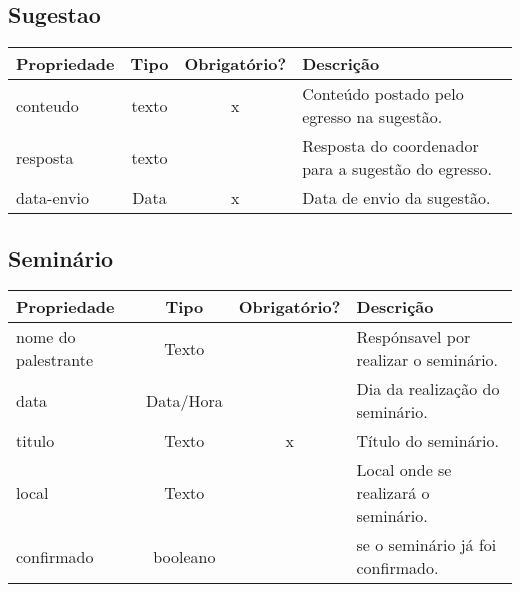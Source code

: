 \subsection{Sugestao} \label{Sugestao}
\begin{table}[h!]
	\footnotesize
	\begin{tabular}{|p{2.6cm}|c|c|p{7.8cm}|}   \hline \rowcolor[rgb]{0.8,0.8,0.8}
	
		
 		\textbf{Propriedade} & \textbf{Tipo} & \textbf{Obrigatório?} & \centerline{\textbf{Descrição}} \\\hline
 		                            
		conteudo & texto & x & Conteúdo postado pelo egresso  na sugestão. \\\hline
		
		resposta & texto & {} & Resposta do coordenador para a sugestão do egresso. \\\hline
		  
  		data-envio & Data & x & Data de envio da sugestão. \\\hline 
  	
  		
	\end{tabular}	
\end{table}


\subsection{Seminário} \label{Seminário}
\begin{table}[h!]
	\footnotesize
	\begin{tabular}{|p{2.6cm}|c|c|p{7.8cm}|}   \hline \rowcolor[rgb]{0.8,0.8,0.8}
	
		
 		\textbf{Propriedade} & \textbf{Tipo} & \textbf{Obrigatório?} & \centerline{\textbf{Descrição}} \\ \hline
 		
		nome do palestrante & Texto & {} & Respónsavel por realizar o seminário. \\\hline
		  
  		data & Data/Hora & {} & Dia da realização do seminário. \\\hline 
  		
  		titulo & Texto & x & Título do seminário. \\\hline  
  		
  		local & Texto & {} & Local onde se realizará o seminário. \\\hline 
  		
  		confirmado & booleano & {} & se o seminário já foi confirmado. \\\hline 
  		
	\end{tabular}	
\end{table}


